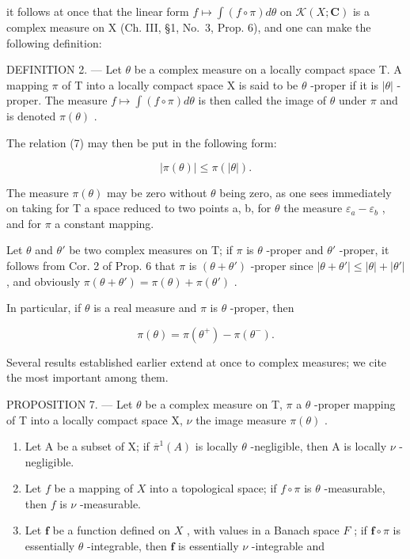 it follows at once that the linear form \(f \mapsto \int(f \circ \pi) d\theta\) on \(\mathcal{K}(X; \mathbf{C})\) is a complex measure on X (Ch. III, §1, No.~3, Prop. 6), and one can make the following definition:

DEFINITION 2. --- Let \(\theta\) be a complex measure on a locally compact space T. A mapping \(\pi\) of T into a locally compact space X is said to be \(\theta\) -proper if it is \(|\theta|\) -proper. The measure \(f \mapsto \int(f \circ \pi) d\theta\) is then called the image of \(\theta\) under \(\pi\) and is denoted \(\pi(\theta)\) .

The relation (7) may then be put in the following form:

\[
| \pi (\theta) | \leqslant \pi (| \theta |).\tag{8}
\]

The measure \(\pi(\theta)\) may be zero without \(\theta\) being zero, as one sees immediately on taking for T a space reduced to two points a, b, for \(\theta\) the measure \(\varepsilon_{a} - \varepsilon_{b}\) , and for \(\pi\) a constant mapping.

Let \(\theta\) and \(\theta'\) be two complex measures on T; if \(\pi\) is \(\theta\) -proper and \(\theta'\) -proper, it follows from Cor. 2 of Prop. 6 that \(\pi\) is \((\theta + \theta')\) -proper since \(|\theta + \theta'| \leqslant |\theta| + |\theta'|\) , and obviously \(\pi(\theta + \theta') = \pi(\theta) + \pi(\theta')\) .

In particular, if \(\theta\) is a real measure and \(\pi\) is \(\theta\) -proper, then

\[
\pi (\theta) = \pi (\theta^ {+}) - \pi (\theta^ {-}).\tag{9}
\]

Several results established earlier extend at once to complex measures; we cite the most important among them.

PROPOSITION 7. --- Let \(\theta\) be a complex measure on T, \(\pi\) a \(\theta\) -proper mapping of T into a locally compact space X, \(\nu\) the image measure \(\pi(\theta)\) .

\begin{enumerate}
\def\labelenumi{\alph{enumi})}
\item
  Let A be a subset of X; if \(\overline{\pi}^{1}(A)\) is locally \(\theta\) -negligible, then A is locally \(\nu\) -negligible.
\item
  Let \(f\) be a mapping of \(X\) into a topological space; if \(f \circ \pi\) is \(\theta\) -measurable, then \(f\) is \(\nu\) -measurable.
\item
  Let \(\mathbf{f}\) be a function defined on \(X\) , with values in a Banach space \(F\) ; if \(\mathbf{f} \circ \pi\) is essentially \(\theta\) -integrable, then \(\mathbf{f}\) is essentially \(\nu\) -integrable and
\end{enumerate}

